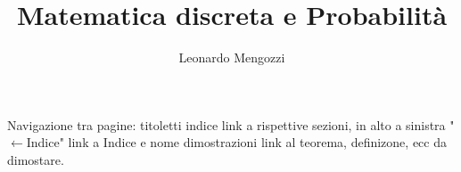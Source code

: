 \documentclass[12pt,a4paper]{article}
\title{Matematica discreta e Probabilità}
\author{Leonardo Mengozzi}
\date{}
\newtheorem[L]{teo}{Teorema}[section]
\newtheorem[L]{deff}{Definizione}[section]
\newtheorem[S]{propo}{Proposizione}[section]
\newtheorem[S]{propr}{Proprietà}[section]
\newtheorem[S]{cor}{Corollario}[section]
\begin{document}
	\maketitle

	\begin{center}
		\tiny Navigazione tra pagine: titoletti indice link a rispettive sezioni, in alto a sinistra "$\leftarrow$Indice" link a Indice e nome dimostrazioni link al teorema, definizone, ecc da dimostare.
	\end{center}

	\tableofcontents\label{toc}

	
	
	
	
\end{document}
